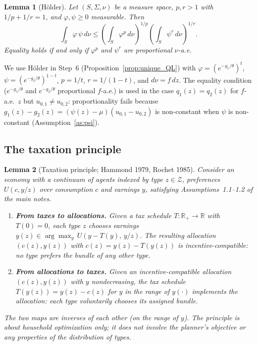 \documentclass[12pt,a4paper]{article}
\theoremstyle{definition}
\theoremstyle{plain}
\newtheorem{lemma}{Lemma}[section]
\theoremstyle{remark}
\newcommand{\R}{\mathbb{R}}
\newcommand{\calZ}{\mathcal{Z}}
\begin{document}
\begin{lemma}[H\"{o}lder]
\label{lem:holder}
Let $(S, \Sigma, \nu)$ be a measure space, $p, r > 1$ with
$1/p + 1/r = 1$, and $\varphi, \psi \geq 0$ measurable.
Then
\begin{equation}
\label{eq:holder}
  \int_S \varphi\,\psi\,d\nu
  \leq
  \left(\int_S \varphi^p\,d\nu\right)^{\!1/p}
  \left(\int_S \psi^r\,d\nu\right)^{\!1/r}.
\end{equation}
Equality holds if and only if $\varphi^p$ and $\psi^r$
are proportional $\nu$-a.e.
\end{lemma}

We use H\"{o}lder in Step~6
(Proposition~\ref{prop:unique_QL}) with
$\varphi = (e^{-g_1/\theta})^t$,
$\psi = (e^{-g_2/\theta})^{1-t}$,
$p = 1/t$, $r = 1/(1-t)$, and $d\nu = f\,dz$.  The
equality condition ($e^{-g_1/\theta}$ and $e^{-g_2/\theta}$
proportional $f$-a.e.) is used in the case
$q_1(z) = q_2(z)$ for $f$-a.e.\ $z$ but
$u_{0,1} \neq u_{0,2}$: proportionality fails because
$g_1(z) - g_2(z) = (\psi(z)-\mu)(u_{0,1}-u_{0,2})$ is
non-constant when $\psi$ is non-constant
(Assumption~\ref{as:psi}).



\subsection{The taxation principle}

\begin{lemma}[Taxation principle; Hammond 1979, Rochet 1985]
\label{lem:taxation_principle}
Consider an economy with a continuum of agents indexed by
type $z \in \calZ$, preferences $U(c, y/z)$ over
consumption $c$ and earnings $y$, satisfying
Assumptions~1.1--1.2 of the main notes.
\begin{enumerate}[label=(\roman*)]
\item \textbf{From taxes to allocations.}
  Given a tax schedule $T: \R_+ \to \R$ with $T(0) = 0$,
  each type $z$ chooses earnings
  $y(z) \in \arg\max_y\, U(y - T(y),\, y/z)$.  The
  resulting allocation $(c(z), y(z))$ with
  $c(z) = y(z) - T(y(z))$ is incentive-compatible:
  no type prefers the bundle of any other type.
\item \textbf{From allocations to taxes.}
  Given an incentive-compatible allocation $(c(z), y(z))$
  with $y$ nondecreasing, the tax schedule
  $T(y(z)) = y(z) - c(z)$ for $y$ in the range of
  $y(\cdot)$ implements the allocation: each type
  voluntarily chooses its assigned bundle.
\end{enumerate}
The two maps are inverses of each other (on the range of
$y$).  The principle is about household optimization only;
it does not involve the planner's objective or any
properties of the distribution of types.
\end{lemma}
\end{document}
